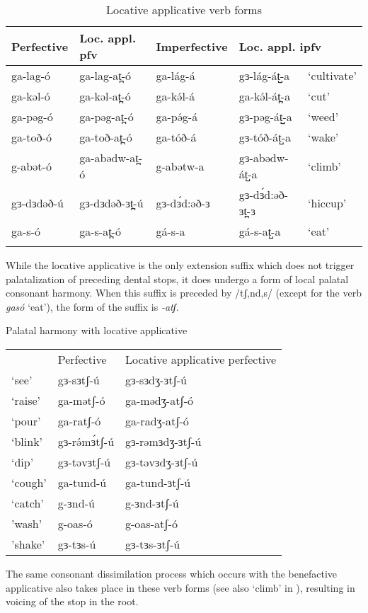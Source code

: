 \begin{table}
\begin{tabular}[t]{lllll}
\lsptoprule
Perfective	& 	Loc. appl. pfv 	& Imperfective & \multicolumn{2}{l}{Loc. appl. ipfv} 	 \\
\midrule
ga-lag-ó	&	ga-lag-at̪-ó		& 	ga-lág-á	&	gɜ-lág-át̺-a 	& ‘cultivate’\\ 
ga-kəl-ó 	&	ga-kəl-at̪-ó 		& ga-kə́l-á 	&	ga-kə́l-át̪-a 	 & ‘cut’ 			\\ %
ga-pəg-ó	&	ga-pəg-at̪-ó		& 	ga-pə́g-á	&	gɜ-pəg-át̺-a 	& ‘weed’\\ 
ga-toð-ó	&	ga-toð-at̪-ó		& 	ga-tóð-á	&	gɜ-tóð-át̺-a 	& ‘wake’\\ 
g-abət-ó	&	ga-abədw-at̪-ó		& 	g-abətw-a	&	gɜ-abədw-át̺-a 	& ‘climb’\\ 
gɜ-dɜdəð-ú	&	gɜ-dɜdəð-ɜt̪-ú	& 	gɜ-dɜ́d:əð-ɜ	&	gɜ-dɜ́d:əð-ɜt̪-ɜ 	& ‘hiccup’\\ 
ga-s-ó	&	ga-s-at̪-ó		& 	gá-s-a	&	gá-s-at̺-a 	& ‘eat’\\ 
\lspbottomrule
\end{tabular}
\caption{Locative applicative verb forms} \label{tab:ch11:loc}    
\end{table}  


While the locative applicative is the only extension suffix which does not trigger palatalization of preceding dental stops, it does undergo a form of local palatal consonant harmony. When this suffix is preceded by /tʃ,nd,s/ (except for the verb \textit{gasó} `eat'), the form of the suffix is \textit{-atʃ}.

\ea Palatal harmony with locative applicative\label{ex:ch11:palharm}
\begin{tabular}[t]{lll}
& Perfective & {Locative applicative perfective} \\
`see'  	&  gɜ-sɜtʃ-ú 	& gɜ-sɜdʒ-ɜtʃ-ú \\ 
`raise' &  ga-mətʃ-ó 	& ga-mədʒ-atʃ-ó \\ 
`pour' 	& ga-ratʃ-ó  	& ga-radʒ-atʃ-ó \\
`blink' & gɜ-rə́mɜ́tʃ-ú		& gɜ-rəmɜdʒ-ɜtʃ-ú\\
`dip' & gɜ-təvɜtʃ-ú		& gɜ-təvɜdʒ-ɜtʃ-ú\\
`cough' & ga-tund-ú  	& ga-tund-ɜtʃ-ú \\
`catch' & g-ɜnd-ú  		& g-ɜnd-ɜtʃ-ú \\
'wash' 	& g-oas-ó		& g-oas-atʃ-ó  \\ 
'shake' & gɜ-tɜs-ú		& gɜ-tɜs-ɜtʃ-ú  \\ 
\end{tabular}
\z 
The same consonant dissimilation process which occurs with the benefactive applicative also takes place in these verb forms (see also `climb' in ), resulting in voicing of the stop in the root.

